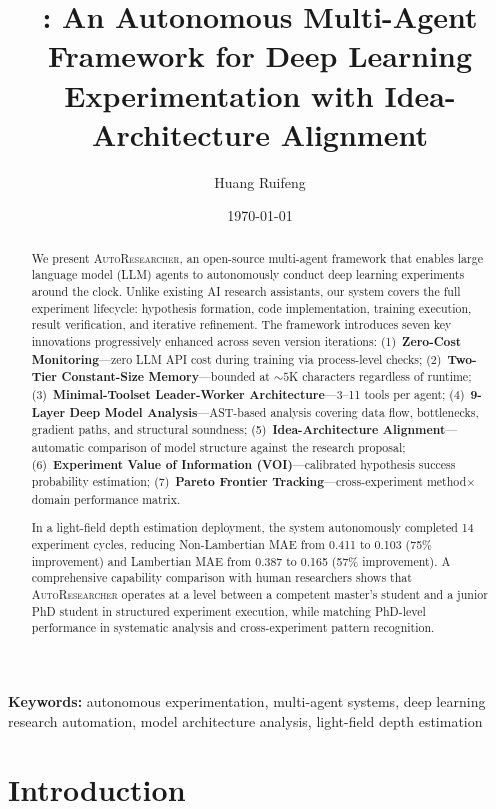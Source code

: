 \documentclass[11pt,a4paper]{article}
\title{\sysname: An Autonomous Multi-Agent Framework for
Deep Learning Experimentation with Idea-Architecture Alignment}
\author{Huang Ruifeng}
\date{\today}
\newcommand{\sysname}{\textsc{AutoResearcher}}
\begin{document}
\maketitle

\begin{abstract}
We present \sysname, an open-source multi-agent framework that enables large language model (LLM) agents to autonomously conduct deep learning experiments around the clock.
Unlike existing AI research assistants, our system covers the full experiment lifecycle: hypothesis formation, code implementation, training execution, result verification, and iterative refinement.
The framework introduces seven key innovations progressively enhanced across seven version iterations:
(1)~\textbf{Zero-Cost Monitoring}---zero LLM API cost during training via process-level checks;
(2)~\textbf{Two-Tier Constant-Size Memory}---bounded at ${\sim}5$K characters regardless of runtime;
(3)~\textbf{Minimal-Toolset Leader-Worker Architecture}---3--11 tools per agent;
(4)~\textbf{9-Layer Deep Model Analysis}---AST-based analysis covering data flow, bottlenecks, gradient paths, and structural soundness;
(5)~\textbf{Idea-Architecture Alignment}---automatic comparison of model structure against the research proposal;
(6)~\textbf{Experiment Value of Information (VOI)}---calibrated hypothesis success probability estimation;
(7)~\textbf{Pareto Frontier Tracking}---cross-experiment method$\times$domain performance matrix.

In a light-field depth estimation deployment, the system autonomously completed 14 experiment cycles, reducing Non-Lambertian MAE from 0.411 to 0.103 (75\% improvement) and Lambertian MAE from 0.387 to 0.165 (57\% improvement).
A comprehensive capability comparison with human researchers shows that \sysname{} operates at a level between a competent master's student and a junior PhD student in structured experiment execution, while matching PhD-level performance in systematic analysis and cross-experiment pattern recognition.
\end{abstract}

\noindent\textbf{Keywords:} autonomous experimentation, multi-agent systems, deep learning research automation, model architecture analysis, light-field depth estimation

\section{Introduction}
\end{document}
